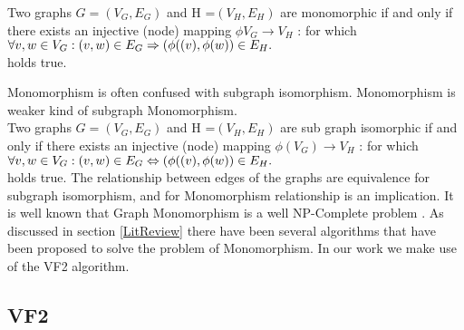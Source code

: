 Two graphs 
 $G =( V_G, E_G)$ and
 H =$( V_H, E_H)$  are monomorphic  if and only if there exists an injective (node)
mapping $\phi V_G \rightarrow  V_H$ : for which $\forall v,w \in V_G:(v,w) \in E_G \Rightarrow (\phi((v),\space \phi(w)) \in E_H.$\\  holds
true. 

Monomorphism is often confused with subgraph isomorphism. Monomorphism is weaker kind of subgraph Monomorphism. \\
Two graphs  $G =( V_G, E_G)$ and
 H =$( V_H, E_H)$  are sub graph isomorphic  if and only if there exists an injective (node)
mapping $\phi( V_G) \rightarrow  V_H$ : for which $\forall v,w \in V_G:(v,w) \in E_G \Leftrightarrow (\phi((v),\space \phi(w)) \in E_H.$\\  holds
true. 
The relationship between edges of the graphs are equivalence for subgraph isomorphism, and for Monomorphism  relationship  is an implication. It is well known that Graph Monomorphism is a
well NP-Complete problem \cite{Garey:1979:CIG:578533}. As discussed in section \ref{LitReview} there have been several algorithms that have been proposed to solve the problem of Monomorphism.
In our work we make use of the VF2 algorithm.


\subsection{VF2}

